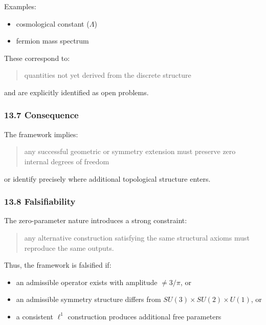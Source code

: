 \documentclass[
]{article}
\providecommand{\tightlist}{%
  \setlength{\itemsep}{0pt}\setlength{\parskip}{0pt}}
\begin{document}
Examples:

\begin{itemize}
\tightlist
\item
  cosmological constant (\(\Lambda\))
\item
  fermion mass spectrum
\end{itemize}

These correspond to:

\begin{quote}
quantities not yet derived from the discrete structure
\end{quote}

and are explicitly identified as open problems.

\hypertarget{consequence}{%
\subsubsection{13.7 Consequence}\label{consequence}}

The framework implies:

\begin{quote}
any successful geometric or symmetry extension must preserve zero
internal degrees of freedom
\end{quote}

or identify precisely where additional topological structure enters.

\hypertarget{falsifiability}{%
\subsubsection{13.8 Falsifiability}\label{falsifiability}}

The zero-parameter nature introduces a strong constraint:

\begin{quote}
any alternative construction satisfying the same structural axioms must
reproduce the same outputs.
\end{quote}

Thus, the framework is falsified if:

\begin{itemize}
\tightlist
\item
  an admissible operator exists with amplitude \(\neq 3/\pi\), or
\item
  an admissible symmetry structure differs from
  \(SU(3) \times SU(2) \times U(1)\), or
\item
  a consistent \(\ell^1\) construction produces additional free
  parameters
\end{itemize}
\end{document}
